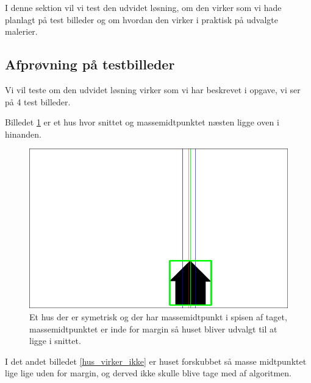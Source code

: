{\sffamily
I denne sektion vil vi test den udvidet løsning, om den virker som vi
hade planlagt på test billeder og om hvordan den virker i praktisk på
udvalgte malerier.
}
\subsection{Afprøvning på testbilleder}
Vi vil teste om den udvidet løsning virker som vi har beskrevet i
opgave, vi ser på 4 test billeder. 

Billedet \ref{hus_virker} er et hus
hvor snittet og massemidtpunktet næsten ligge oven i hinanden. 

\begin{figure}[h!!]
	\begin{center}
		\includegraphics[scale=0.3,angle=0]{afsnit/afprovning/billeder/udvidet_losning/udvidet_hus1_test.png}
	\end{center}
	\caption[]{Et hus der er symetrisk og der har massemidtpunkt i spisen af taget, massemidtpunktet er inde for margin så huset bliver udvalgt til at ligge i snittet.}
	\label{hus_virker}
\end{figure}

I det andet billedet \ref{hus_virker_ikke} er huset forskubbet så masse
midtpunktet lige lige uden for margin, og derved ikke skulle blive tage
med af algoritmen. 

